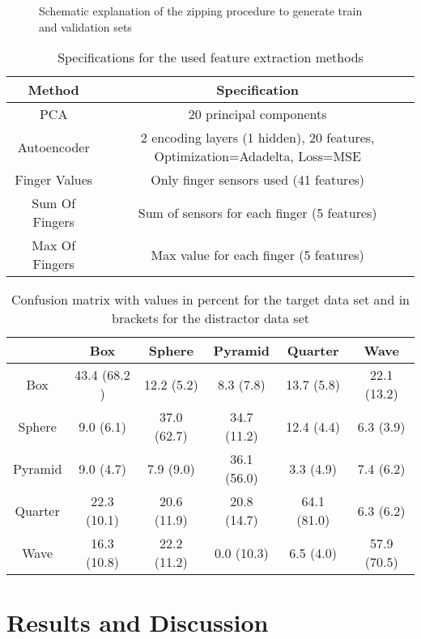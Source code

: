 \begin{figure}[h]
	\caption{Schematic explanation of the zipping procedure to generate train and validation sets}
	\label{zip}
\end{figure}

\begin{table}[H]
\centering
\begin{tabular}{|c|c|}
\hline
Method & Specification \\
\hline\hline
PCA & 20 principal components \\
Autoencoder & 2 encoding layers (1 hidden), 20 features, Optimization=Adadelta, Loss=MSE\\
Finger Values & Only finger sensors used (41 features) \\
Sum Of Fingers & Sum of sensors for each finger (5 features) \\
Max Of Fingers & Max value for each finger (5 features) \\
\hline
\end{tabular}
\caption{Specifications for the used feature extraction methods}
\label{FE}
\end{table} 

\begin{table}[H]
	\centering
	\begin{tabular}{|c||c|c|c|c|c|}
		\hline
		 & Box & Sphere & Pyramid & Quarter & Wave \\
		\hline\hline
		Box     & 43.4 (68.2 )& 12.2 (5.2)   & 8.3 (7.8)   & 13.7 (5.8)   & 22.1 (13.2) \\
		Sphere  & 9.0 (6.1)     & 37.0 (62.7)    & 34.7 (11.2) & 12.4 (4.4)   & 6.3 (3.9)\\
		Pyramid & 9.0 (4.7)     & 7.9  (9.0)     & 36.1 (56.0) & 3.3 (4.9)    & 7.4 (6.2)\\
		Quarter & 22.3 (10.1) & 20.6 (11.9)  & 20.8 (14.7) & 64.1 (81.0)  & 6.3 (6.2)\\
		Wave    & 16.3 (10.8) & 22.2 (11.2)  & 0.0 (10.3)    & 6.5 (4.0)    & 57.9 (70.5)\\
		\hline
	\end{tabular}
	\caption{Confusion matrix with values in percent for the target data set and in brackets for the distractor data set}
	\label{Confusion}
\end{table} 
\section{Results and Discussion} \label{results}
